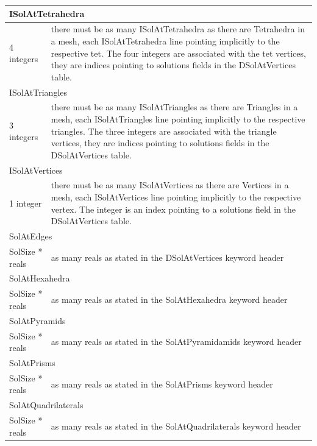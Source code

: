 \documentclass[a4paper,12pt]{article}
\begin{document}
\begin{longtable}{|m{4cm}|m{11cm}|}
\multicolumn{2}{|l|}{ISolAtTetrahedra} \\
\hline
4 integers & there must be as many ISolAtTetrahedra as there are Tetrahedra in a mesh, each ISolAtTetrahedra line pointing implicitly to the respective tet. The four integers are associated with the tet vertices, they are indices pointing to solutions fields in the DSolAtVertices table. \\
\hline\hline

\multicolumn{2}{|l|}{ISolAtTriangles} \\
\hline
3 integers & there must be as many ISolAtTriangles as there are Triangles in a mesh, each ISolAtTriangles line pointing implicitly to the respective triangles. The three integers are associated with the triangle vertices, they are indices pointing to solutions fields in the DSolAtVertices table. \\
\hline\hline

\multicolumn{2}{|l|}{ISolAtVertices} \\
\hline
1 integer & there must be as many ISolAtVertices as there are Vertices in a mesh, each ISolAtVertices line pointing implicitly to the respective vertex. The integer is an index pointing to a solutions field in the DSolAtVertices table. \\
\hline\hline

\multicolumn{2}{|l|}{SolAtEdges} \\
\hline
SolSize * reals & as many reals as stated in the DSolAtVertices keyword header \\
\hline\hline

\multicolumn{2}{|l|}{SolAtHexahedra} \\
\hline
SolSize * reals & as many reals as stated in the SolAtHexahedra keyword header \\
\hline\hline

\multicolumn{2}{|l|}{SolAtPyramids} \\
\hline
SolSize * reals & as many reals as stated in the SolAtPyramidamids keyword header \\
\hline\hline

\multicolumn{2}{|l|}{SolAtPrisms} \\
\hline
SolSize * reals & as many reals as stated in the SolAtPrisms keyword header \\
\hline\hline

\multicolumn{2}{|l|}{SolAtQuadrilaterals} \\
\hline
SolSize * reals & as many reals as stated in the SolAtQuadrilaterals keyword header \\
\hline\hline


\end{longtable}
\end{document}
